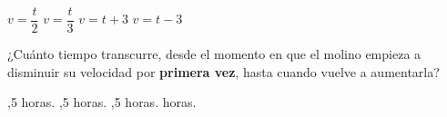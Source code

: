 \documentclass[10pt,letterpaper,addpoints]{exam}
\begin{document}
\begin{questions}
\begin{oneparchoices}
\CorrectChoice $v=\dfrac{t}{2}$
\choice $v=\dfrac{t}{3}$
\choice $v=t+3$
\choice $v=t-3$
\end{oneparchoices}
\question ¿Cuánto tiempo transcurre, desde el momento en que el molino empieza a disminuir su velocidad por \textbf{primera vez}, hasta cuando vuelve a aumentarla?

\begin{oneparchoices}
,5 horas.
,5 horas.
,5 horas.
 horas.
\end{oneparchoices}
\end{questions}
\end{document}
